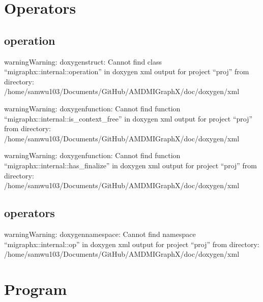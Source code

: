\documentclass[letterpaper,10pt,english]{sphinxmanual}
\begin{document}
\section{Operators}
\label{\detokenize{dev/operators:operators}}\label{\detokenize{dev/operators::doc}}

\subsection{operation}
\label{\detokenize{dev/operators:operation}}
\begin{sphinxadmonition}{warning}{Warning:}
\sphinxAtStartPar
doxygenstruct: Cannot find class “migraphx::internal::operation” in doxygen xml output for project “proj” from directory: /home/samwu103/Documents/GitHub/AMDMIGraphX/doc/doxygen/xml
\end{sphinxadmonition}

\begin{sphinxadmonition}{warning}{Warning:}
\sphinxAtStartPar
doxygenfunction: Cannot find function “migraphx::internal::is\_context\_free” in doxygen xml output for project “proj” from directory: /home/samwu103/Documents/GitHub/AMDMIGraphX/doc/doxygen/xml
\end{sphinxadmonition}

\begin{sphinxadmonition}{warning}{Warning:}
\sphinxAtStartPar
doxygenfunction: Cannot find function “migraphx::internal::has\_finalize” in doxygen xml output for project “proj” from directory: /home/samwu103/Documents/GitHub/AMDMIGraphX/doc/doxygen/xml
\end{sphinxadmonition}


\subsection{operators}
\label{\detokenize{dev/operators:id1}}
\begin{sphinxadmonition}{warning}{Warning:}
\sphinxAtStartPar
doxygennamespace: Cannot find namespace “migraphx::internal::op” in doxygen xml output for project “proj” from directory: /home/samwu103/Documents/GitHub/AMDMIGraphX/doc/doxygen/xml
\end{sphinxadmonition}


\section{Program}
\label{\detokenize{dev/program:program}}\label{\detokenize{dev/program::doc}}
\end{document}
